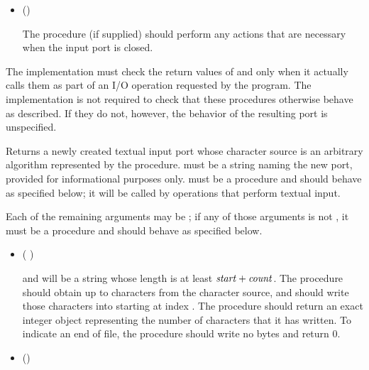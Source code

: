 \begin{entry}{%
}
\begin{itemize}
\item {\cf ()}
       
  The  procedure (if supplied) should perform any actions
  that are necessary when the input port is closed.
\end{itemize}

\implresp The implementation must check the return
values of  and  only when it actually calls
them as part of an I/O operation requested by the program.  The
implementation is not required to check that these procedures
otherwise behave as described.  If they do not, however, the behavior
of the resulting port is unspecified.
\end{entry}

\begin{entry}{%
}

Returns a newly created textual input port whose character source is
an arbitrary algorithm represented by the  procedure.
 must be a string naming the new port,
provided for informational purposes only.
 must be a procedure and should behave as specified
below; it will be called by operations that perform textual input.

Each of the remaining arguments may be \schfalse{}; if any of
those arguments is not \schfalse{}, it must be a procedure and
should behave as specified below.
   
\begin{itemize}
\item {\cf (   )}
       
  and  will be a string whose length is at least
  $\textnormal{\textit{start}} + \textnormal{\textit{count}}$.
  The  procedure should obtain up to  characters
  from the character source, and should write those characters
  into  starting at index .
  The  procedure should return an exact integer object
  representing the number of characters that it has written.
  To indicate an end of file, the 
  procedure should write no bytes and return 0.

\item {\cf ()}
       

\end{itemize}
\end{entry}
